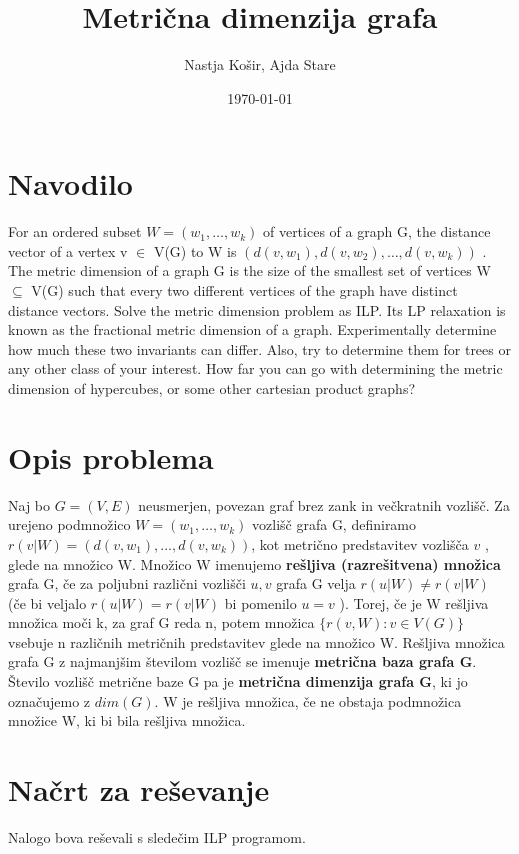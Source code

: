 \documentclass[a4paper]{report}
\title{Metrična dimenzija grafa }
\author{Nastja Košir, Ajda Stare}
\date{\today}
\begin{document}
	\maketitle

\section*{Navodilo}
For an ordered subset $W = (w_1 , \dots, w_k ) $ of vertices of a graph G, the distance vector of a vertex v $\in$ V(G)  to  W  is  $(d(v, w_1 ), d(v, w_2 ), \dots, d(v, w_k ))$ . The metric dimension of a graph G is the size of the smallest set of vertices W  $\subseteq $ V(G) such that every two different vertices of the graph have distinct distance vectors. Solve the metric dimension problem as ILP. Its LP relaxation is known as the fractional metric dimension of a graph. Experimentally determine how much these two invariants can differ. Also, try to determine them for trees or any other class of your interest. How far you can go with determining the metric dimension of hypercubes, or some other cartesian product graphs?\\

\section*{Opis problema}
Naj bo $G=(V,E)$ neusmerjen, povezan graf brez zank in večkratnih vozlišč. Za urejeno podmnožico $ W =(w_1 , \dots, w_k )$ vozlišč grafa G, definiramo\\$r(v|W) = (d(v,w_1),\dots, d(v,w_k))$, kot  metrično predstavitev vozlišča $v$ , glede na množico W. Množico W imenujemo \textbf{rešljiva (razrešitvena) množica} grafa G, če za poljubni  različni vozlišči $u,v$ grafa G velja $r(u|W)\neq r(v|W)$ (če bi veljalo $r(u|W)= r(v|W)$ bi pomenilo $u = v$ ). Torej, če je W rešljiva množica moči k, za graf G reda n, potem množica $\{r(v,W): v\in V(G)\}$ vsebuje n različnih metričnih predstavitev glede na množico W. Rešljiva množica grafa G z najmanjšim številom vozlišč se imenuje \textbf{metrična baza grafa G}. Število vozlišč metrične baze G pa je \textbf{metrična dimenzija grafa G}, ki jo označujemo z \textbf{$dim(G)$}. W je rešljiva množica, če ne obstaja podmnožica množice W, ki bi bila rešljiva množica.  

\section*{Načrt za reševanje}
Nalogo bova reševali s sledečim ILP programom.\\
\end{document}
